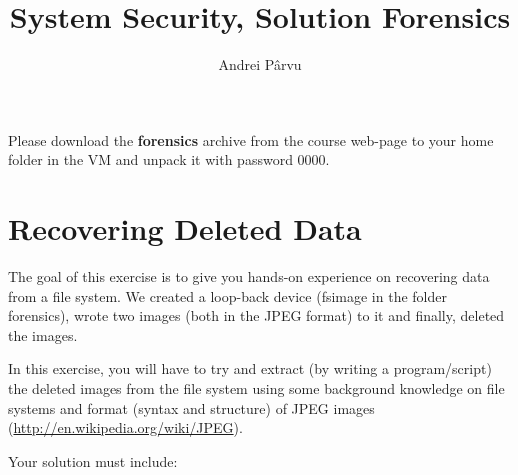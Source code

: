 \documentclass[a4paper,11pt]{article}
\title{System Security,
\ifsolution Solution \else \fi
Forensics}
\author{Andrei Pârvu}
\begin{document}
\maketitle

\noindent Please download the \textbf{forensics} archive from the course web-page to your home
folder in the VM and unpack it with password 0000.

\section{Recovering Deleted Data}
The goal of this exercise is to give you hands-on experience on recovering
data from a file system. We created a loop-back device (fsimage in the folder
forensics), wrote two images (both in the JPEG format) to it and finally, deleted
the images.  \newline

\noindent In this exercise, you will have to try and extract (by writing a
program/script) the deleted images from the file system using some background
knowledge on file systems and format (syntax and structure) of JPEG
images (\url{http://en.wikipedia.org/wiki/JPEG}). \newline


\noindent Your solution must include:
\end{document}
